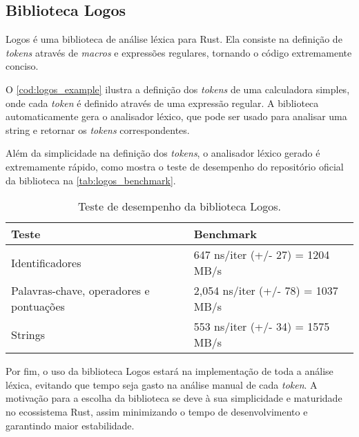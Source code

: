 \subsection{Biblioteca Logos}

Logos é uma biblioteca de análise léxica para Rust. Ela consiste na definição de \textit{tokens} através de \textit{macros} e expressões regulares, tornando o código extremamente conciso.

O \autoref{cod:logos_example} ilustra a definição dos \textit{tokens} de uma calculadora simples, onde cada \textit{token} é definido através de uma expressão regular. A biblioteca automaticamente gera o analisador léxico, que pode ser usado para analisar uma string e retornar os \textit{tokens} correspondentes.


\vspace{-1em}

Além da simplicidade na definição dos \textit{tokens}, o analisador léxico gerado é extremamente rápido, como mostra o teste de desempenho do repositório oficial da biblioteca na \autoref{tab:logos_benchmark}.

\begin{table}
	\centering
	\caption{Teste de desempenho da biblioteca Logos.}
	{
		\begin{tabular}{ll}
			\hline
			\textbf{Teste} & \textbf{Benchmark} \\ \hline
			Identificadores & 647 ns/iter (+/- 27) = 1204 MB/s \\
			Palavras-chave, operadores e pontuações & 2,054 ns/iter (+/- 78) = 1037 MB/s \\
			Strings & 553 ns/iter (+/- 34) = 1575 MB/s \\ \hline
		\end{tabular}
	}
	\label{tab:logos_benchmark}
\end{table}

Por fim, o uso da biblioteca Logos estará na implementação de toda a análise léxica, evitando que tempo seja gasto na análise manual de cada \textit{token}. A motivação para a escolha da biblioteca se deve à sua simplicidade e maturidade no ecossistema Rust, assim minimizando o tempo de desenvolvimento e garantindo maior estabilidade.
